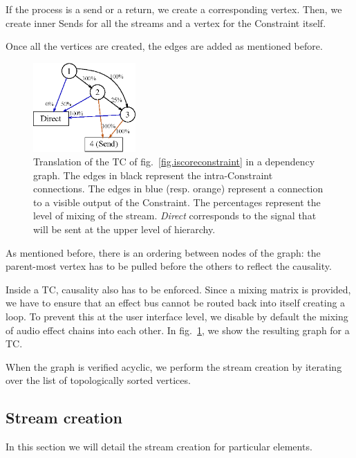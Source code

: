 \documentclass{article}
\newcommand*{\timeconstraint}{\ac{TC}\xspace}
\begin{document}
If the process is a send or a return, we create a corresponding vertex.
Then, we create inner Sends for all the streams and a vertex for the Constraint itself.

Once all the vertices are created, the edges are added as mentioned before.

\begin{figure}
	\centering
	\includegraphics[width=0.35\textwidth]{figures/graph1.eps}
	\caption{Translation of the \timeconstraint of fig.~\ref{fig.iscoreconstraint} in a dependency graph.
		The edges in black represent the intra-Constraint connections. 
		The edges in blue (resp. orange) represent a connection to a visible output of 
		the Constraint. The percentages represent the level of mixing of the stream.
		\textit{Direct} corresponds to the signal that will be sent at the upper level of hierarchy.}
	\label{fig.graph}
\end{figure}

As mentioned before, there is an ordering between nodes of the graph: the parent-most vertex
has to be pulled before the others to reflect the causality.


Inside a \timeconstraint, causality also has to be enforced. 
Since a mixing matrix is provided, we have to ensure that an effect bus cannot be routed back into itself creating a loop. 
To prevent this at the user interface level, we disable by default the mixing of audio effect chains into each other. In fig.~\ref{fig.graph}, we show the resulting graph for a \timeconstraint. 

When the graph is verified acyclic, we perform the stream creation by iterating over the list of topologically sorted vertices.

\subsection{Stream creation}
In this section we will detail the stream creation for particular elements.
\end{document}

